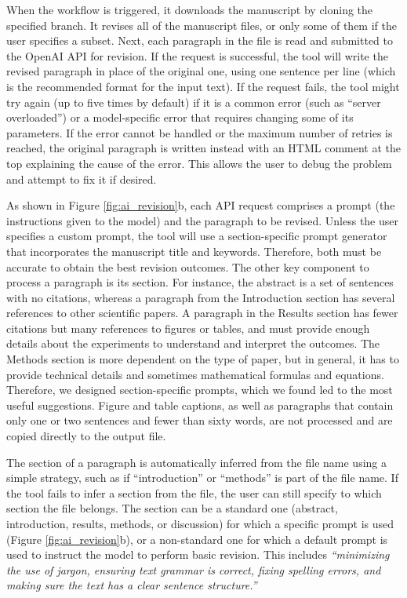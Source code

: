 \documentclass[
]{article}
\begin{document}
When the workflow is triggered, it downloads the manuscript by cloning the specified branch.
It revises all of the manuscript files, or only some of them if the user specifies a subset.
Next, each paragraph in the file is read and submitted to the OpenAI API for revision.
If the request is successful, the tool will write the revised paragraph in place of the original one, using one sentence per line (which is the recommended format for the input text).
If the request fails, the tool might try again (up to five times by default) if it is a common error (such as ``server overloaded'') or a model-specific error that requires changing some of its parameters.
If the error cannot be handled or the maximum number of retries is reached, the original paragraph is written instead with an HTML comment at the top explaining the cause of the error.
This allows the user to debug the problem and attempt to fix it if desired.

As shown in Figure \ref{fig:ai_revision}b, each API request comprises a prompt (the instructions given to the model) and the paragraph to be revised.
Unless the user specifies a custom prompt, the tool will use a section-specific prompt generator that incorporates the manuscript title and keywords.
Therefore, both must be accurate to obtain the best revision outcomes.
The other key component to process a paragraph is its section.
For instance, the abstract is a set of sentences with no citations, whereas a paragraph from the Introduction section has several references to other scientific papers.
A paragraph in the Results section has fewer citations but many references to figures or tables, and must provide enough details about the experiments to understand and interpret the outcomes.
The Methods section is more dependent on the type of paper, but in general, it has to provide technical details and sometimes mathematical formulas and equations.
Therefore, we designed section-specific prompts, which we found led to the most useful suggestions.
Figure and table captions, as well as paragraphs that contain only one or two sentences and fewer than sixty words, are not processed and are copied directly to the output file.

The section of a paragraph is automatically inferred from the file name using a simple strategy, such as if ``introduction'' or ``methods'' is part of the file name.
If the tool fails to infer a section from the file, the user can still specify to which section the file belongs.
The section can be a standard one (abstract, introduction, results, methods, or discussion) for which a specific prompt is used (Figure \ref{fig:ai_revision}b), or a non-standard one for which a default prompt is used to instruct the model to perform basic revision.
This includes \emph{``minimizing the use of jargon, ensuring text grammar is correct, fixing spelling errors, and making sure the text has a clear sentence structure.''}
\end{document}
